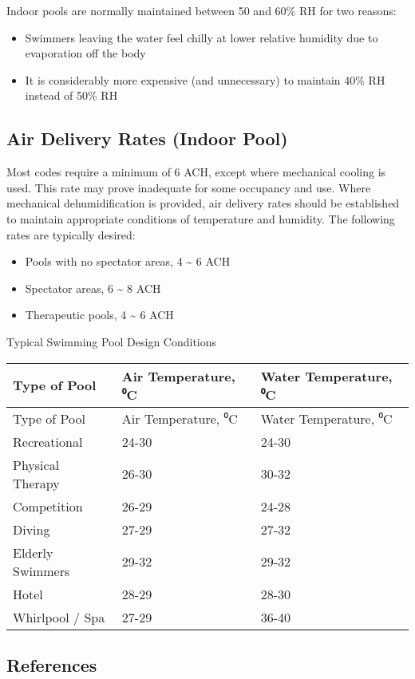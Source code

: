 Indoor pools are normally maintained between 50 and 60\% RH for two reasons:

\begin{itemize}
\tightlist
\item
  Swimmers leaving the water feel chilly at lower relative humidity due to evaporation off the body
\item
  It is considerably more expensive (and unnecessary) to maintain 40\% RH instead of 50\% RH
\end{itemize}

\subsection{Air Delivery Rates (Indoor Pool)}\label{air-delivery-rates-indoor-pool}

Most codes require a minimum of 6 ACH, except where mechanical cooling is used. This rate may prove inadequate for some occupancy and use. Where mechanical dehumidification is provided, air delivery rates should be established to maintain appropriate conditions of temperature and humidity. The following rates are typically desired:

\begin{itemize}
\tightlist
\item
  Pools with no spectator areas, 4 \textasciitilde{} 6 ACH
\item
  Spectator areas, 6 \textasciitilde{} 8 ACH
\item
  Therapeutic pools, 4 \textasciitilde{} 6 ACH
\end{itemize}

Typical Swimming Pool Design Conditions

\begin{longtable}[c]{@{}lll@{}}
\toprule 
Type of Pool & Air Temperature, ⁰C & Water Temperature, ⁰C \tabularnewline
\midrule
\endfirsthead

\toprule 
Type of Pool & Air Temperature, ⁰C & Water Temperature, ⁰C \tabularnewline
\midrule
\endhead

Recreational & 24-30 & 24-30 \tabularnewline
Physical Therapy & 26-30 & 30-32 \tabularnewline
Competition & 26-29 & 24-28 \tabularnewline
Diving & 27-29 & 27-32 \tabularnewline
Elderly Swimmers & 29-32 & 29-32 \tabularnewline
Hotel & 28-29 & 28-30 \tabularnewline
Whirlpool / Spa & 27-29 & 36-40 \tabularnewline
\bottomrule
\end{longtable}

\subsection{References}\label{references-030}

